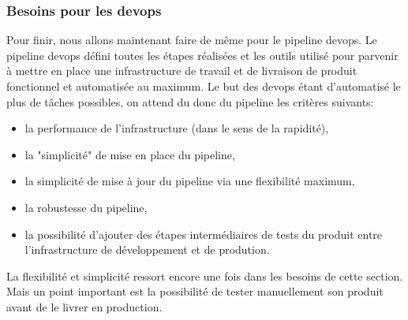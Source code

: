 \documentclass[
    iai, %
    il, %
]{heig-tb}
\begin{document}
\subsubsection{Besoins pour les \Gls{devops}}
Pour finir, nous allons maintenant faire de même pour le pipeline \Gls{devops}.
Le pipeline \Gls{devops} défini toutes les étapes réalisées et les outils utilisé pour parvenir à mettre en place une infrastructure de travail et de livraison de produit fonctionnel et automatisée au maximum.
Le but des \Gls{devops} étant d'automatisé le plus de tâches possibles, on attend du donc du pipeline les critères suivants:
\begin{itemize}
    \item la performance de l'infrastructure (dans le sens de la rapidité),
    \item la "simplicité" de mise en place du pipeline,
    \item la simplicité de mise à jour du pipeline via une flexibilité maximum,
    \item la robustesse du pipeline,
    \item la possibilité d'ajouter des étapes intermédiaires de tests du produit entre l'infrastructure de développement et de prodution.
\end{itemize}

La flexibilité et simplicité ressort encore une fois dans les besoins de cette section.
Mais un point important est la possibilité de tester manuellement son produit avant de le livrer en production.

\end{document}
